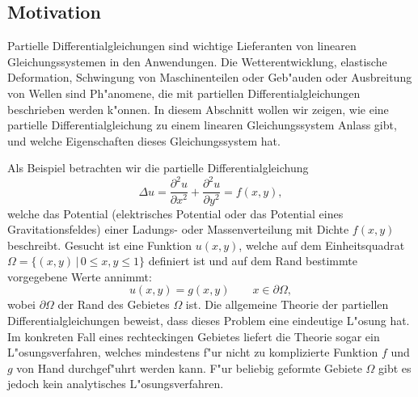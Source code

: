 \subsection{Motivation\label{section-motivation}}
Partielle Differentialgleichungen sind wichtige Lieferanten von 
linearen Gleichungssystemen in den Anwendungen.
Die Wetterentwicklung, elastische Deformation, Schwingung von
Maschinenteilen oder Geb"auden oder Ausbreitung von Wellen sind
Ph"anomene, die mit partiellen Differentialgleichungen beschrieben
werden k"onnen. In diesem Abschnitt wollen wir zeigen, wie eine
partielle Differentialgleichung zu einem linearen Gleichungssystem
Anlass gibt, und welche Eigenschaften dieses Gleichungssystem hat.

Als Beispiel betrachten wir die partielle Differentialgleichung
\begin{equation}
\Delta u
=\frac{\partial^2u}{\partial x^2}+\frac{\partial^2u}{\partial y^2}
=f(x,y),
\label{motivation-pdgl}
\end{equation}
welche das Potential (elektrisches Potential oder das Potential eines
Gravitationsfeldes) einer Ladungs- oder Massenverteilung mit
Dichte $f(x,y)$ beschreibt.
Gesucht ist eine Funktion $u(x,y)$, welche auf dem Einheitsquadrat
$\Omega = \{(x,y)\,|\, 0\le x,y\le 1\}$ definiert ist und auf dem Rand bestimmte
vorgegebene Werte annimmt:
\begin{equation}
u(x,y)=g(x,y)\qquad x\in\partial \Omega,
\label{motivation-randbedingung}
\end{equation}
wobei $\partial\Omega$ der Rand des Gebietes $\Omega$ ist. Die allgemeine
Theorie der partiellen Differentialgleichungen beweist, dass dieses
Problem eine eindeutige L"osung hat.
Im konkreten Fall eines rechteckingen Gebietes liefert die Theorie sogar
ein L"osungsverfahren, welches mindestens f"ur nicht zu komplizierte
Funktion $f$ und $g$ von Hand durchgef"uhrt werden kann.
F"ur beliebig geformte Gebiete $\Omega$ gibt es jedoch kein analytisches
L"osungsverfahren.

